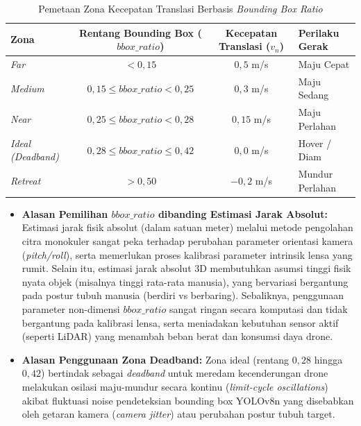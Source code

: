 \begin{table}[H]
	\centering
	\caption{Pemetaan Zona Kecepatan Translasi Berbasis \textit{Bounding Box Ratio}}
	\label{tab:speed_zones}
	\begin{tabular}{|l|c|c|l|}
		\hline
		\textbf{Zona} & \textbf{Rentang Bounding Box ($bbox\_ratio$)} & \textbf{Kecepatan Translasi ($v_n$)} & \textbf{Perilaku Gerak} \\
		\hline
		\textit{Far} & $< 0,15$ & $0,5$ m/s & Maju Cepat \\
		\textit{Medium} & $0,15 \le bbox\_ratio < 0,25$ & $0,3$ m/s & Maju Sedang \\
		\textit{Near} & $0,25 \le bbox\_ratio < 0,28$ & $0,15$ m/s & Maju Perlahan \\
		\textit{Ideal (Deadband)} & $0,28 \le bbox\_ratio \le 0,42$ & $0,0$ m/s & Hover / Diam \\
		\textit{Retreat} & $> 0,50$ & $-0,2$ m/s & Mundur Perlahan \\
		\hline
	\end{tabular}
\end{table}
\begin{itemize}
	\item \textbf{Alasan Pemilihan $bbox\_ratio$ dibanding Estimasi Jarak Absolut:} Estimasi jarak fisik absolut (dalam satuan meter) melalui metode pengolahan citra monokuler sangat peka terhadap perubahan parameter orientasi kamera (\textit{pitch/roll}), serta memerlukan proses kalibrasi parameter intrinsik lensa yang rumit. Selain itu, estimasi jarak absolut 3D membutuhkan asumsi tinggi fisik nyata objek (misalnya tinggi rata-rata manusia), yang bervariasi bergantung pada postur tubuh manusia (berdiri vs berbaring). Sebaliknya, penggunaan parameter non-dimensi $bbox\_ratio$ sangat ringan secara komputasi dan tidak bergantung pada kalibrasi lensa, serta meniadakan kebutuhan sensor aktif (seperti LiDAR) yang menambah beban berat dan konsumsi daya drone.
	\item \textbf{Alasan Penggunaan Zona Deadband:} Zona ideal (rentang $0,28$ hingga $0,42$) bertindak sebagai \textit{deadband} untuk meredam kecenderungan drone melakukan osilasi maju-mundur secara kontinu (\textit{limit-cycle oscillations}) akibat fluktuasi noise pendeteksian bounding box YOLOv8n yang disebabkan oleh getaran kamera (\textit{camera jitter}) atau perubahan postur tubuh target.
\end{itemize}

